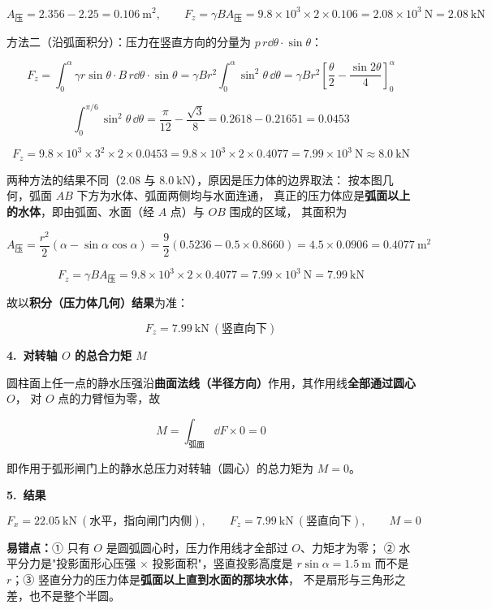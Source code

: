 \begin{jie}
\[ A_{\text{压}}=2.356-2.25=0.106\ \mathrm{m^2},\qquad
F_z=\gamma B A_{\text{压}}=9.8\times10^{3}\times2\times0.106
=2.08\times10^{3}\ \mathrm{N}=2.08\ \mathrm{kN} \]

方法二（沿弧面积分）：压力在竖直方向的分量为 $p\,r\dd\theta\cdot\sin\theta$：

\[ F_z=\int_0^{\alpha}\gamma r\sin\theta\cdot B\,r\dd\theta\cdot\sin\theta
=\gamma Br^2\int_0^{\alpha}\sin^2\theta\,\dd\theta
=\gamma Br^2\left[\frac{\theta}{2}-\frac{\sin2\theta}{4}\right]_0^{\alpha} \]

\[ \int_0^{\pi/6}\sin^2\theta\,\dd\theta=\frac{\pi}{12}-\frac{\sqrt3}{8}
=0.2618-0.21651=0.0453 \]

\[ F_z=9.8\times10^{3}\times3^{2}\times2\times0.0453
=9.8\times10^{3}\times2\times0.4077
=7.99\times10^{3}\ \mathrm{N}\approx8.0\ \mathrm{kN} \]

两种方法的结果不同（$2.08$ 与 $8.0\ \mathrm{kN}$），原因是压力体的边界取法：
按本图几何，弧面 $AB$ 下方为水体、弧面两侧均与水面连通，
真正的压力体应是\textbf{弧面以上的水体}，即由弧面、水面（经 $A$ 点）与 $OB$ 围成的区域，
其面积为

\[ A_{\text{压}}=\frac{r^2}{2}\left(\alpha-\sin\alpha\cos\alpha\right)
=\frac{9}{2}\left(0.5236-0.5\times0.8660\right)=4.5\times0.0906=0.4077\ \mathrm{m^2} \]

\[ F_z=\gamma B A_{\text{压}}=9.8\times10^{3}\times2\times0.4077
=7.99\times10^{3}\ \mathrm{N}=7.99\ \mathrm{kN} \]

故以\textbf{积分（压力体几何）结果}为准：

\[ F_z=7.99\ \mathrm{kN}\ (\text{竖直向下}) \]

\textbf{4.\ 对转轴 $O$ 的总合力矩 $M$}

圆柱面上任一点的静水压强沿\textbf{曲面法线（半径方向）}作用，其作用线\textbf{全部通过圆心 $O$}，
对 $O$ 点的力臂恒为零，故

\[ M=\int_{\text{弧面}}\dd F\times0=0 \]

即作用于弧形闸门上的静水总压力对转轴（圆心）的总力矩为 $M=0$。

\textbf{5.\ 结果}

\[ F_x=22.05\ \mathrm{kN}\ (\text{水平，指向闸门内侧}),\qquad
F_z=7.99\ \mathrm{kN}\ (\text{竖直向下}),\qquad M=0 \]

\begin{yicuo}
\textbf{易错点：}① 只有 $O$ 是圆弧圆心时，压力作用线才全部过 $O$、力矩才为零；
② 水平分力是"投影面形心压强 $\times$ 投影面积"，竖直投影高度是 $r\sin\alpha=1.5\ \mathrm{m}$
而不是 $r$；③ 竖直分力的压力体是\textbf{弧面以上直到水面的那块水体}，
不是扇形与三角形之差，也不是整个半圆。
\end{yicuo}
\end{jie}


